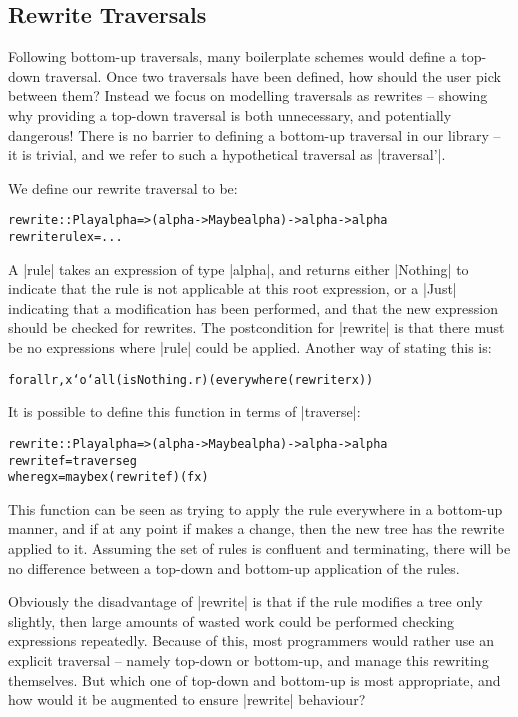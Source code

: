 \documentclass[preprint]{sigplanconf}
\newenvironment{code}{\begin{alltt}\small}{\end{alltt}}
\begin{document}
\subsection{Rewrite Traversals}

Following bottom-up traversals, many boilerplate schemes would define a top-down traversal. Once two traversals have been defined, how should the user pick between them? Instead we focus on modelling traversals as rewrites -- showing why providing a top-down traversal is both unnecessary, and potentially dangerous! There is no barrier to defining a bottom-up traversal in our library -- it is trivial, and we refer to such a hypothetical traversal as |traversal'|.

We define our rewrite traversal to be:

\begin{code}
rewrite :: Play alpha => (alpha -> Maybe alpha) -> alpha -> alpha
rewrite rule x = ...
\end{code}

A |rule| takes an expression of type |alpha|, and returns either |Nothing| to indicate that the rule is not applicable at this root expression, or a |Just| indicating that a modification has been performed, and that the new expression should be checked for rewrites. The postcondition for |rewrite| is that there must be no expressions where |rule| could be applied. Another way of stating this is:

\begin{code}
forall r, x `o` all (isNothing . r) (everywhere (rewrite r x))
\end{code}

It is possible to define this function in terms of |traverse|:

\begin{code}
rewrite :: Play alpha => (alpha -> Maybe alpha) -> alpha -> alpha
rewrite f = traverse g
    where g x = maybe x (rewrite f) (f x)
\end{code}

This function can be seen as trying to apply the rule everywhere in a bottom-up manner, and if at any point if makes a change, then the new tree has the rewrite applied to it. Assuming the set of rules is confluent and terminating, there will be no difference between a top-down and bottom-up application of the rules.

Obviously the disadvantage of |rewrite| is that if the rule modifies a tree only slightly, then large amounts of wasted work could be performed checking expressions repeatedly. Because of this, most programmers would rather use an explicit traversal -- namely top-down or bottom-up, and manage this rewriting themselves. But which one of top-down and bottom-up is most appropriate, and how would it be augmented to ensure |rewrite| behaviour?
\end{document}
